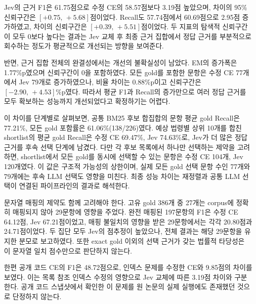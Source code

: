 Jev의 근거 F1은 61.75점으로 수정 CE의 58.57점보다 3.19점 높았으며,
차이의 95\% 신뢰구간은 $[+0.75,\,+5.68]$점이었다.
Recall도 57.74점에서 60.69점으로 2.95점 증가하였고,
차이의 신뢰구간은 $[+0.39,\,+5.51]$점이었다.
두 지표의 탐색적 신뢰구간이 모두 0보다 높다는 결과는
Jev 교체 후 최종 근거 집합에서 정답 근거를 부분적으로 회수하는
정도가 평균적으로 개선되는 방향을 보여준다.

반면, 근거 집합 전체의 완결성에서는 개선의 불확실성이 남았다.
EM의 증가폭은 1.77\%p였으며 신뢰구간이 0을 포함하였다.
모든 gold를 포함한 문항은 수정 CE 77개에서 Jev 79개로 증가하였으나,
비율 차이는 0.88\%p이고 신뢰구간은 $[-2.90,\,+4.53]$\%p였다.
따라서 평균 F1과 Recall의 증가만으로 여러 정답 근거를 모두 확보하는
성능까지 개선되었다고 확정하기는 어렵다.

이 차이를 단계별로 살펴보면, 공통 BM25 후보 합집합의 문항 평균
gold Recall은 77.21\%, 모든 gold 포함률은 61.06\%(138/226)였다.
예상 법령별 상위 10개를 합친 shortlist의 평균 gold Recall은
수정 CE 69.47\%, Jev 74.63\%로, Jev가 더 많은 정답 근거를
후속 선택 단계에 남겼다. 다만 각 후보 목록에서 하나만 선택하는
제약을 고려하면, shortlist에서 모든 gold를 동시에 선택할 수 있는
문항은 수정 CE 104개, Jev 120개였다. 이 값은 구조적 가능성의 상한이며,
실제 모든 gold 선택 문항 수인 77개와 79개에는 후속 LLM 선택도
영향을 미친다. 최종 성능 차이는 재정렬과 공통 LLM 선택이 연결된
파이프라인의 결과로 해석한다.

문자열 매핑의 제약도 함께 고려해야 한다. 고유 gold 386개 중 27개는
corpus에 정확히 매핑되지 않아 29문항에 영향을 주었다.
완전 매핑된 197문항의 F1은 수정 CE 64.12점, Jev 67.21점이었고,
매핑 불일치의 영향을 받은 29문항에서는 각각 20.80점과 24.71점이었다.
두 집단 모두 Jev의 점추정이 높았으나, 전체 결과는 해당 29문항을
유지한 분모로 보고하였다. 또한 exact gold 이외의 선택 근거가 갖는
법률적 타당성은 이 문자열 일치 점수만으로 판단하지 않는다.

한편 공개 코드 CE의 F1은 48.72점으로, 인덱스 문제를 수정한 CE와
9.85점의 차이를 보였다. 이는 목록 참조 인덱스 수정의 영향으로
Jev 교체에 따른 3.19점 차이와 구분한다. 공개 코드 스냅샷에서
확인한 이 문제를 원 논문의 실제 실행에도 존재했던 것으로
단정하지 않는다.
